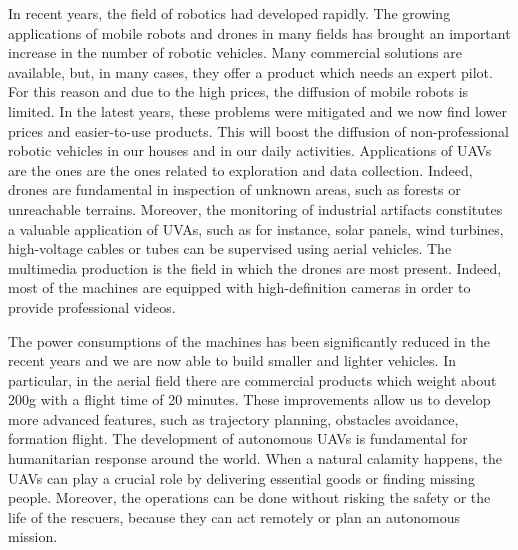 


In recent years, the field of robotics had developed rapidly.
The growing applications of mobile robots and drones in many fields
has brought an important increase in the number of robotic vehicles.
Many commercial solutions are available, but, in many cases, they offer
a product which needs an expert pilot. For this reason and due to the high prices,
the diffusion of mobile robots is limited. In the latest years, these problems were
mitigated and we now find lower prices and easier-to-use products. This will boost
the diffusion of non-professional robotic vehicles in our houses and in our daily activities.
Applications of UAVs are the ones are the ones related to exploration and data
collection. Indeed, drones are fundamental in inspection of unknown areas, such as
forests or unreachable terrains.
Moreover, the monitoring of industrial artifacts constitutes a valuable application of UVAs,
such as for instance, solar panels, wind turbines, high-voltage cables or tubes can be
supervised using aerial vehicles.
The multimedia production is the field in which the drones are most present. Indeed,
most of the machines are equipped with high-definition cameras in order to provide
professional videos.

The power consumptions of the machines has been significantly reduced in the recent years
and we are now able to build smaller and lighter vehicles.
In particular, in the aerial field there are commercial products which weight
about 200g with a flight time of 20 minutes.
These improvements allow us to develop more advanced features, such as
trajectory planning, obstacles avoidance, formation flight.
The development of autonomous UAVs is fundamental for humanitarian
response around the world. When a natural calamity happens, the UAVs can play a
crucial role by delivering essential goods or finding missing people. Moreover, the
operations can be done without risking the safety or the life of the rescuers, because
they can act remotely or plan an autonomous mission.

